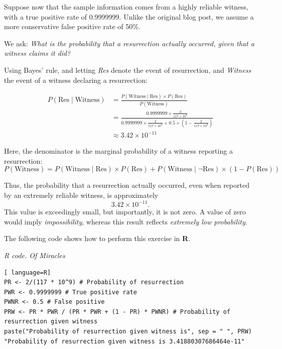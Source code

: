 Suppose now that the sample information comes from a highly reliable witness, with a true positive rate of 0.9999999. Unlike the original blog post, we assume a more conservative false positive rate of 50\%.

We ask: \emph{What is the probability that a resurrection actually occurred, given that a witness claims it did?}

Using Bayes' rule, and letting \emph{Res} denote the event of resurrection, and \emph{Witness} the event of a witness declaring a resurrection:

\begin{align*}
	P(\text{Res} \mid \text{Witness}) &= \frac{P(\text{Witness} \mid \text{Res}) \times P(\text{Res})}{P(\text{Witness})} \\
	&= \frac{0.9999999 \times \frac{2}{117 \times 10^9}}{0.9999999 \times \frac{2}{117 \times 10^9} + 0.5 \times \left(1 - \frac{2}{117 \times 10^9} \right)} \\
	&\approx 3.42 \times 10^{-11}
\end{align*}

Here, the denominator is the marginal probability of a witness reporting a resurrection:
\[
P(\text{Witness}) = P(\text{Witness} \mid \text{Res}) \times P(\text{Res}) + P(\text{Witness} \mid \lnot\text{Res}) \times (1 - P(\text{Res}))
\]

Thus, the probability that a resurrection actually occurred, even when reported by an extremely reliable witness, is approximately 
\[
3.42 \times 10^{-11}.
\]
This value is exceedingly small, but importantly, it is not zero. A value of zero would imply \emph{impossibility}, whereas this result reflects \emph{extremely low probability}.

The following code shows how to perform this exercise in \textbf{R}.

\begin{tcolorbox}[enhanced,width=4.67in,center upper,
	fontupper=\large\bfseries,drop shadow southwest,sharp corners]
\textit{R code. Of Miracles}
\begin{VF}
\begin{lstlisting}[ language=R]
PR <- 2/(117 * 10^9) # Probability of resurrection
PWR <- 0.9999999 # True positive rate
PWNR <- 0.5 # False positive
PRW <- PR * PWR / (PR * PWR + (1 - PR) * PWNR) # Probability of resurrection given witness
paste("Probability of resurrection given witness is", sep = " ", PRW)
"Probability of resurrection given witness is 3.41880307686464e-11"
\end{lstlisting}
\end{VF}
\end{tcolorbox}

